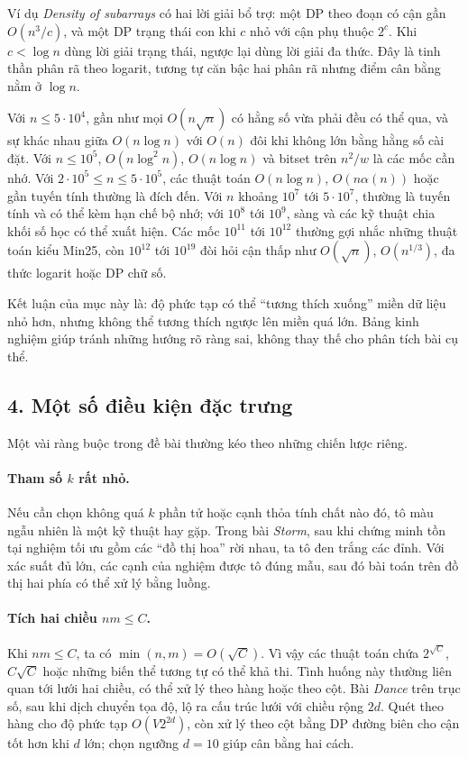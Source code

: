 \documentclass[11pt]{article}
\begin{document}
Ví dụ \emph{Density of subarrays} có hai lời giải bổ trợ: một DP theo đoạn có
cận gần \(O(n^3/c)\), và một DP trạng thái con khi \(c\) nhỏ với cận phụ thuộc
\(2^c\). Khi \(c<\log n\) dùng lời giải trạng thái, ngược lại dùng lời giải
đa thức. Đây là tinh thần phân rã theo logarit, tương tự căn bậc hai phân rã
nhưng điểm cân bằng nằm ở \(\log n\).

Với \(n\le5\cdot10^4\), gần như mọi \(O(n\sqrt n)\) có hằng số vừa phải đều có
thể qua, và sự khác nhau giữa \(O(n\log n)\) với \(O(n)\) đôi khi không lớn
bằng hằng số cài đặt. Với \(n\le10^5\), \(O(n\log^2 n)\), \(O(n\log n)\) và
bitset trên \(n^2/w\) là các mốc cần nhớ. Với \(2\cdot10^5\le n\le5\cdot10^5\),
các thuật toán \(O(n\log n)\), \(O(n\alpha(n))\) hoặc gần tuyến tính thường là
đích đến. Với \(n\) khoảng \(10^7\) tới \(5\cdot10^7\), thường là tuyến tính và
có thể kèm hạn chế bộ nhớ; với \(10^8\) tới \(10^9\), sàng và các kỹ thuật chia
khối số học có thể xuất hiện. Các mốc \(10^{11}\) tới \(10^{12}\) thường gợi
nhắc những thuật toán kiểu Min25, còn \(10^{12}\) tới \(10^{19}\) đòi hỏi cận
thấp như \(O(\sqrt n)\), \(O(n^{1/3})\), đa thức logarit hoặc DP chữ số.

Kết luận của mục này là: độ phức tạp có thể ``tương thích xuống'' miền dữ liệu
nhỏ hơn, nhưng không thể tương thích ngược lên miền quá lớn. Bảng kinh nghiệm
giúp tránh những hướng rõ ràng sai, không thay thế cho phân tích bài cụ thể.

\subsection*{4. Một số điều kiện đặc trưng}

Một vài ràng buộc trong đề bài thường kéo theo những chiến lược riêng.

\paragraph{Tham số \(k\) rất nhỏ.}
Nếu cần chọn không quá \(k\) phần tử hoặc cạnh thỏa tính chất nào đó, tô màu
ngẫu nhiên là một kỹ thuật hay gặp. Trong bài \emph{Storm}, sau khi chứng minh
tồn tại nghiệm tối ưu gồm các ``đồ thị hoa'' rời nhau, ta tô đen trắng các
đỉnh. Với xác suất đủ lớn, các cạnh của nghiệm được tô đúng mẫu, sau đó bài
toán trên đồ thị hai phía có thể xử lý bằng luồng.

\paragraph{Tích hai chiều \(nm\le C\).}
Khi \(nm\le C\), ta có \(\min(n,m)=O(\sqrt C)\). Vì vậy các thuật toán chứa
\(2^{\sqrt C}\), \(C\sqrt C\) hoặc những biến thể tương tự có thể khả thi. Tình
huống này thường liên quan tới lưới hai chiều, có thể xử lý theo hàng hoặc
theo cột. Bài \emph{Dance} trên trục số, sau khi dịch chuyển tọa độ, lộ ra cấu
trúc lưới với chiều rộng \(2d\). Quét theo hàng cho độ phức tạp
\(O(V2^{2d})\), còn xử lý theo cột bằng DP đường biên cho cận tốt hơn khi
\(d\) lớn; chọn ngưỡng \(d=10\) giúp cân bằng hai cách.
\end{document}
